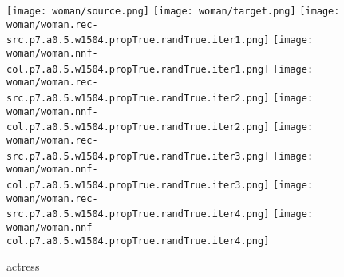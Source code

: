 \documentclass{article}
\begin{document}
\begin{figure}[H]
\centering
\texttt{[image: woman/source.png]}\enskip
\texttt{[image: woman/target.png]}
\texttt{[image: woman/woman.rec-src.p7.a0.5.w1504.propTrue.randTrue.iter1.png]}\enskip
\texttt{[image: woman/woman.nnf-col.p7.a0.5.w1504.propTrue.randTrue.iter1.png]}
\texttt{[image: woman/woman.rec-src.p7.a0.5.w1504.propTrue.randTrue.iter2.png]}\enskip
\texttt{[image: woman/woman.nnf-col.p7.a0.5.w1504.propTrue.randTrue.iter2.png]}
\texttt{[image: woman/woman.rec-src.p7.a0.5.w1504.propTrue.randTrue.iter3.png]}\enskip
\texttt{[image: woman/woman.nnf-col.p7.a0.5.w1504.propTrue.randTrue.iter3.png]}
\texttt{[image: woman/woman.rec-src.p7.a0.5.w1504.propTrue.randTrue.iter4.png]}\enskip
\texttt{[image: woman/woman.nnf-col.p7.a0.5.w1504.propTrue.randTrue.iter4.png]}
\caption{actress}
\end{figure}
\end{document}
